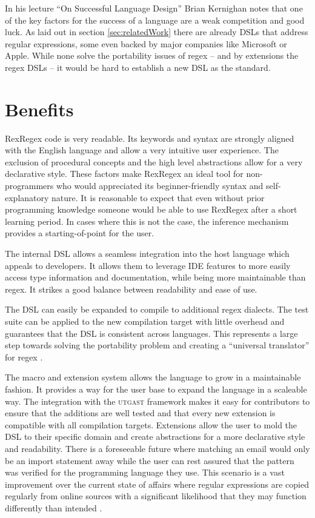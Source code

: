 In his lecture \enquote{On Successful Language Design} \cite{OnSuccessfulLanuageDesignKernighan} Brian Kernighan notes that one of the key factors for the success of a language are a weak competition and good luck. As laid out in section \ref{sec:relatedWork} there are already DSLs that address regular expressions, some even backed by major companies like Microsoft or Apple. While none solve the portability issues of regex -- and by extensions the regex DSLs -- it would be hard to establish a new DSL as the standard.

\section{Benefits}
 
RexRegex code is very readable. Its keywords and syntax are strongly aligned with the English language and allow a very intuitive user experience. The exclusion of procedural concepts and the high level abstractions allow for a very declarative style. These factors make RexRegex an ideal tool for non-programmers who would appreciated its beginner-friendly syntax and self-explanatory nature. It is reasonable to expect that even without prior programming knowledge someone would be able to use RexRegex after a short learning period. In cases where this is not the case, the inference mechanism provides a starting-of-point for the user.

The internal DSL allows a seamless integration into the host language which appeals to developers. It allows them to leverage IDE features to more easily access type information and documentation, while being more maintainable than regex. It strikes a good balance between readability and ease of use.

The DSL can easily be expanded to compile to additional regex dialects. The test suite can be applied to the new compilation target with little overhead and guarantees that the DSL is consistent across languages. This represents a large step towards solving the portability problem and creating a \enquote{universal translator} for regex \cite{RegexNotLinguaFranca}.

The macro and extension system allows the language to grow in a maintainable fashion. It provides a way for the user base to expand the language in a scaleable way. The integration with the \textsc{utgast} framework makes it easy for contributors to ensure that the additions are well tested and that every new extension is compatible with all compilation targets. Extensions allow the user to mold the DSL to their specific domain and create abstractions for a more declarative style and readability. There is a foreseeable future where matching an email would only be an import statement away while the user can rest assured that the pattern was verified for the programming language they use. This scenario is a vast improvement over the current state of affairs where regular expressions are copied regularly from online sources with a significant likelihood that they may function differently than intended \cite{RegexNotLinguaFranca}.

